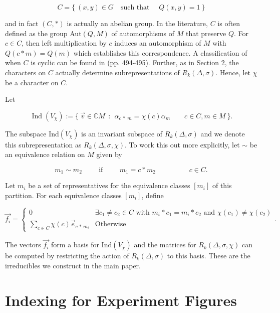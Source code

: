 \documentclass[12pt,reqno]{amsart}
\theoremstyle{remark}
\numberwithin{table}{section}
\newcommand{\C}{\mathbb C}
\begin{document}
\[ C = \{ \: (x,y) \in G \quad \text{such that }\quad Q(x,y) = 1 \: \} \]

\vspace{.2cm}
\noindent and in fact $(C,*)$ is actually an abelian group. In the literature, $C$ is often defined as the group Aut$(Q,M)$ of automorphisms of $M$ that preserve $Q$. For $c \in C$, then left multiplication by $c$ induces an automorphism of $M$ with $Q(c*m) = Q(m)$ which establishes this correspondence. A classification of when $C$ is cyclic can be found in \cite{nobs1976irreduziblenp1} (pp. 494-495). Further, as in Section 2, the characters on $C$ actually determine subrepresentations of $R_k(\Delta, \sigma)$.  Hence, let $\chi$ be a character on $C$. 


\noindent Let

\[ \operatorname{Ind}(V_\chi) :=  \{  \: \vec{v}  \in \C M  \: \: : \: \:  \alpha_{c\: * \: m} = \chi(c) \alpha_{m} \quad \quad c \in C , m \in M \: \}. \]

\vspace{.2cm}
The subspace Ind$(V_\chi)$ is an invariant subspace of $R_k(\Delta, \sigma)$ and we denote this subrepresentation as $R_k(\Delta, \sigma, \chi)$. To work this out more explicitly, let $\sim$ be an equivalence relation on $M$ given by 


\[ m_1 \sim m_2 \hspace{1cm} \text{if} \hspace{1cm} m_1 = c*m_2  \hspace{2cm} c \in C. \] 

\vspace{.2cm}
Let $m_i$ be a set of representatives for the equivalence classes $[m_i]$ of this partition. For each equivalence classes $[m_i]$, define

\[ \vec{f_i} = \begin{cases}

0 & \exists c_1 \neq c_2 \in C \text{ with } m_i *c_1=m_i*c_2 \text{ and } \chi(c_1) \neq  \chi(c_2) \\
 \sum_{c \in C} \chi(c)\vec{e}_{c\,* \, m_i}  & \text{Otherwise}  \end{cases}. \]

The vectors $\vec{f_i}$ form a basis for Ind$(V_\chi)$ and the matrices for $R_k(\Delta, \sigma, \chi)$ can be computed by restricting the action of $R_k(\Delta, \sigma)$ to this basis. These are the irreducibles we construct in the main paper. 

\section{Indexing for Experiment Figures}
\end{document}
